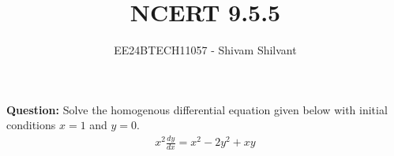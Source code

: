 \documentclass[journal]{IEEEtran}
\begin{document}

\vspace{3cm}

\title{NCERT 9.5.5}
\author{EE24BTECH11057 - Shivam Shilvant}
{\let\newpage\relax\maketitle}

\renewcommand{\thefigure}{\theenumi}
\renewcommand{\thetable}{\theenumi}
\setlength{\intextsep}{10pt} %

\textbf{Question:} Solve the homogenous differential equation given below with initial conditions $x=1$ and $y=0$.
\begin{align}
	x^2\frac{dy}{dx} = x^2-2y^2+xy
\end{align}
\solution 
\end{document}
